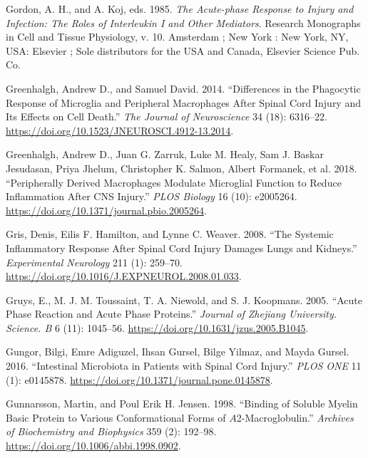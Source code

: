 \documentclass[9pt,lineno]{elife}
\newlength{\cslhangindent}
\newlength{\cslentryspacingunit} %
\newenvironment{CSLReferences}[2] %
 {%
  \setlength{\parindent}{0pt}
  \ifodd #1
  \let\oldpar\par
  \def\par{\hangindent=\cslhangindent\oldpar}
  \fi
  \setlength{\parskip}{#2\cslentryspacingunit}
 }%
 {}
\begin{document}
\begin{CSLReferences}{1}{0}
\leavevmode{}%
Gordon, A. H., and A. Koj, eds. 1985. \emph{The {Acute-phase} Response to Injury and Infection: The Roles of Interleukin {I} and Other Mediators}. Research Monographs in Cell and Tissue Physiology, v. 10. {Amsterdam ; New York : New York, NY, USA}: {Elsevier ; Sole distributors for the USA and Canada, Elsevier Science Pub. Co}.

\leavevmode{}%
Greenhalgh, Andrew D., and Samuel David. 2014. {``Differences in the {Phagocytic Response} of {Microglia} and {Peripheral Macrophages} After {Spinal Cord Injury} and {Its Effects} on {Cell Death}.''} \emph{The Journal of Neuroscience} 34 (18): 6316--22. \url{https://doi.org/10.1523/JNEUROSCI.4912-13.2014}.

\leavevmode{}%
Greenhalgh, Andrew D., Juan G. Zarruk, Luke M. Healy, Sam J. Baskar Jesudasan, Priya Jhelum, Christopher K. Salmon, Albert Formanek, et al. 2018. {``Peripherally Derived Macrophages Modulate Microglial Function to Reduce Inflammation After {CNS} Injury.''} \emph{PLOS Biology} 16 (10): e2005264. \url{https://doi.org/10.1371/journal.pbio.2005264}.

\leavevmode{}%
Gris, Denis, Eilis F. Hamilton, and Lynne C. Weaver. 2008. {``The Systemic Inflammatory Response After Spinal Cord Injury Damages Lungs and Kidneys.''} \emph{Experimental Neurology} 211 (1): 259--70. \url{https://doi.org/10.1016/J.EXPNEUROL.2008.01.033}.

\leavevmode{}%
Gruys, E., M. J. M. Toussaint, T. A. Niewold, and S. J. Koopmans. 2005. {``Acute Phase Reaction and Acute Phase Proteins.''} \emph{Journal of Zhejiang University. Science. B} 6 (11): 1045--56. \url{https://doi.org/10.1631/jzus.2005.B1045}.

\leavevmode{}%
Gungor, Bilgi, Emre Adiguzel, Ihsan Gursel, Bilge Yilmaz, and Mayda Gursel. 2016. {``Intestinal {Microbiota} in {Patients} with {Spinal Cord Injury}.''} \emph{PLOS ONE} 11 (1): e0145878. \url{https://doi.org/10.1371/journal.pone.0145878}.

\leavevmode{}%
Gunnarsson, Martin, and Poul Erik H. Jensen. 1998. {``Binding of {Soluble Myelin Basic Protein} to {Various Conformational Forms} of {\(A\)}2-{Macroglobulin}.''} \emph{Archives of Biochemistry and Biophysics} 359 (2): 192--98. \url{https://doi.org/10.1006/abbi.1998.0902}.


\end{CSLReferences}
\end{document}
